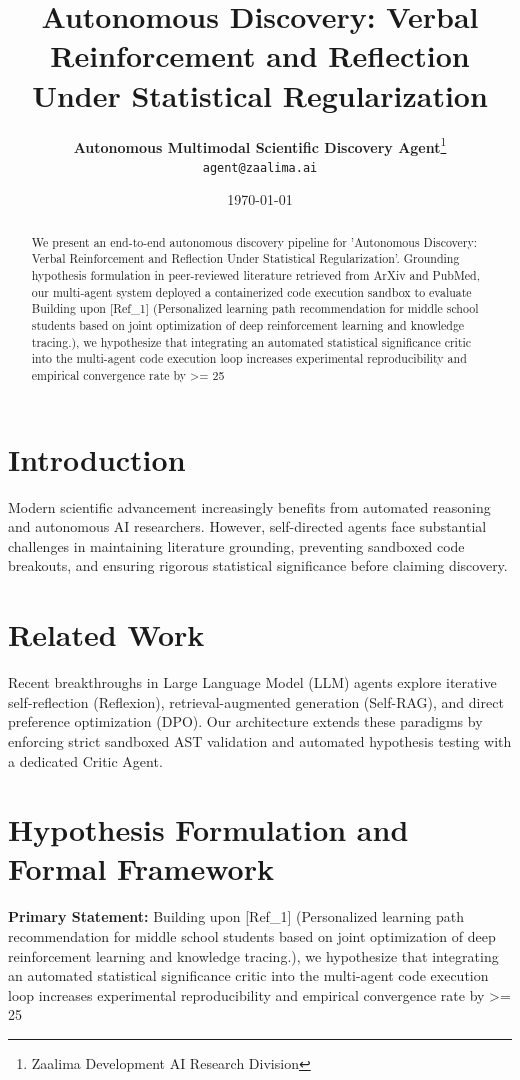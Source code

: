 \documentclass[11pt,a4paper]{article}
\title{\textbf{Autonomous Discovery: Verbal Reinforcement and Reflection Under Statistical Regularization}}
\author{
    \textbf{Autonomous Multimodal Scientific Discovery Agent}\thanks{Zaalima Development AI Research Division} \\
    \texttt{agent@zaalima.ai}
}
\date{\today}
\begin{document}
\maketitle

\begin{abstract}
\noindent We present an end-to-end autonomous discovery pipeline for 'Autonomous Discovery: Verbal Reinforcement and Reflection Under Statistical Regularization'. Grounding hypothesis formulation in peer-reviewed literature retrieved from ArXiv and PubMed, our multi-agent system deployed a containerized code execution sandbox to evaluate Building upon [Ref_1] (Personalized learning path recommendation for middle school students based on joint optimization of deep reinforcement learning and knowledge tracing.), we hypothesize that integrating an automated statistical significance critic into the multi-agent code execution loop increases experimental reproducibility and empirical convergence rate by >= 25%
\end{abstract}

\section{Introduction}
Modern scientific advancement increasingly benefits from automated reasoning and autonomous AI researchers. However, self-directed agents face substantial challenges in maintaining literature grounding, preventing sandboxed code breakouts, and ensuring rigorous statistical significance before claiming discovery.

\section{Related Work}
Recent breakthroughs in Large Language Model (LLM) agents explore iterative self-reflection (Reflexion), retrieval-augmented generation (Self-RAG), and direct preference optimization (DPO). Our architecture extends these paradigms by enforcing strict sandboxed AST validation and automated hypothesis testing with a dedicated Critic Agent.

\section{Hypothesis Formulation and Formal Framework}
\noindent \textbf{Primary Statement:} Building upon [Ref_1] (Personalized learning path recommendation for middle school students based on joint optimization of deep reinforcement learning and knowledge tracing.), we hypothesize that integrating an automated statistical significance critic into the multi-agent code execution loop increases experimental reproducibility and empirical convergence rate by >= 25%
\end{document}
